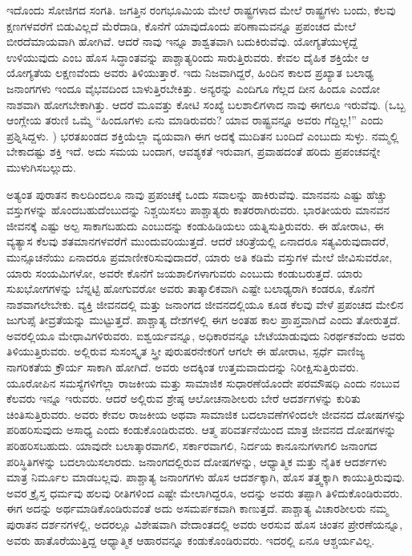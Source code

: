 ಇದೊಂದು ಸೋಜಿಗದ ಸಂಗತಿ. ಜಗತ್ತಿನ ರಂಗಭೂಮಿಯ ಮೇಲೆ ರಾಷ್ಟ್ರಗಳಾದ ಮೇಲೆ ರಾಷ್ಟ್ರಗಳು ಬಂದು, ಕೆಲವು ಕ್ಷಣಗಳವರೆಗೆ ಬಿಡುವಿಲ್ಲದೆ ಮೆರೆದಾಡಿ, ಕೊನೆಗೆ ಯಾವುದೊಂದು ಪರಿಣಾಮವನ್ನೂ ಪ್ರಪಂಚದ ಮೇಲೆ ಬೀರದೆಮಾಯವಾಗಿ ಹೋಗಿವೆ. ಆದರೆ ನಾವು ಇನ್ನೂ ಶಾಶ್ವತವಾಗಿ ಬದುಕಿರುವೆವು. ಯೋಗ್ಯತೆಯುಳ್ಳದ್ದೆ ಉಳಿಯುವುದು ಎಂಬ ಹೊಸ ಸಿದ್ಧಾಂತವನ್ನು ಪಾಶ್ಚಾತ್ಯರಿಂದು ಸಾರುತ್ತಿರುವರು. ಕೇವಲ ದೈಹಿಕ ಶಕ್ತಿಯೇ ಆ ಯೋಗ್ಯತೆಯ ಲಕ್ಷಣವೆಂದು ಅವರು ತಿಳಿಯುತ್ತಾರೆ. ಇದು ನಿಜವಾಗಿದ್ದರೆ, ಹಿಂದಿನ ಕಾಲದ ಪ್ರಖ್ಯಾತ ಬಲಾಢ್ಯ ಜನಾಂಗಗಳು ಇಂದೂ ವೈಭವದಿಂದ ಬಾಳುತ್ತಿರಬೇಕಿತ್ತು. ಅನ್ಯರನ್ನು ಎಂದಿಗೂ ಗೆಲ್ಲದ ದೀನ ಹಿಂದೂ ಎಂದೋ ನಾಶವಾಗಿ ಹೋಗಬೇಕಾಗಿತ್ತು. ಆದರೆ ಮೂವತ್ತು ಕೋಟಿ ಸಂಖ್ಯೆ ಬಲಶಾಲಿಗಳಾದ ನಾವು ಈಗಲೂ ಇರುವೆವು. (ಒಬ್ಬ ಆಂಗ್ಲೇಯ ತರುಣಿ ಒಮ್ಮೆ “ಹಿಂದೂಗಳು ಏನು ಮಾಡಿರುವರು? ಯಾವ ರಾಷ್ಟ್ರವನ್ನೂ ಅವರು ಗೆದ್ದಿಲ್ಲ!” ಎಂದು ಪ್ರಶ್ನಿಸಿದ್ದಳು. ) ಭರತಖಂಡದ ಶಕ್ತಿಯೆಲ್ಲಾ ವ್ಯಯವಾಗಿ ಈಗ ಅದಕ್ಕೆ ಮುದಿತನ ಬಂದಿದೆ ಎಂಬುದು ಸುಳ್ಳು. ನಮ್ಮಲ್ಲಿ ಬೇಕಾದಷ್ಟು ಶಕ್ತಿ ಇದೆ. ಅದು ಸಮಯ ಬಂದಾಗ, ಆವಶ್ಯಕತೆ ಇರುವಾಗ, ಪ್ರವಾಹದಂತೆ ಹರಿದು ಪ್ರಪಂಚವನ್ನೇ ಮುಳುಗಿಸಬಲ್ಲುದು. 

ಅತ್ಯಂತ ಪುರಾತನ ಕಾಲದಿಂದಲೂ ನಾವು ಪ್ರಪಂಚಕ್ಕೆ ಒಂದು ಸವಾಲನ್ನು ಹಾಕಿರುವೆವು. ಮಾನವನು ಎಷ್ಟು ಹೆಚ್ಚು ವಸ್ತುಗಳನ್ನು ಹೊಂದಬಹುದೆಂಬುದನ್ನು ನಿಶ್ಚಯಿಸಲು ಪಾಶ್ಚಾತ್ಯರು ಕಾತರರಾಗಿರುವರು. ಭಾರತೀಯರು ಮಾನವನ ಜೀವನಕ್ಕೆ ಎಷ್ಟು ಅಲ್ಪ ಸಾಕಾಗಬಹುದು ಎಂಬುದನ್ನು ಕಂಡುಹಿಡಿಯಲು ಯತ್ನಿಸುತ್ತಿರುವರು. ಈ ಹೋರಾಟ, ಈ ವ್ಯತ್ಯಾಸ ಕೆಲವು ಶತಮಾನಗಳವರೆಗೆ ಮುಂದುವರಿಯುತ್ತದೆ. ಆದರೆ ಚರಿತ್ರೆಯಲ್ಲಿ ಏನಾದರೂ ಸತ್ಯವಿರುವುದಾದರೆ, ಮುನ್ಸೂಚನೆಯು ಏನಾದರೂ ಪ್ರಮಾಣೀಕರಿಸುವುದಾದರೆ, ಯಾರು ಅತಿ ಕಡಿಮೆ ವಸ್ತುಗಳ ಮೇಲೆ ಜೀವಿಸುವರೋ, ಯಾರು ಸಂಯಮಿಗಳೋ, ಅವರೇ ಕೊನೆಗೆ ಜಯಶಾಲಿಗಳಾಗುವರು ಎಂಬುದು ಕಂಡುಬರುತ್ತದೆ. ಯಾರು ಸುಖಭೋಗಗಳನ್ನು ಬೆನ್ನಟ್ಟಿ ಹೋಗುವರೋ ಅವರು ತಾತ್ಕಾಲಿಕವಾಗಿ ಎಷ್ಟೇ ಬಲಾಢ್ಯರಾಗಿ ಕಂಡರೂ, ಕೊನೆಗೆ ನಾಶವಾಗಲೇಬೇಕು. ವ್ಯಕ್ತಿ ಜೀವನದಲ್ಲಿ ಮತ್ತು ಜನಾಂಗದ ಜೀವನದಲ್ಲಿಯೂ ಕೂಡ ಕೆಲವು ವೇಳೆ ಪ್ರಪಂಚದ ಮೇಲಿನ ಜುಗುಪ್ಸೆ ತೀವ್ರತೆಯನ್ನು ಮುಟ್ಟುತ್ತದೆ. ಪಾಶ್ಚಾತ್ಯ ದೇಶಗಳಲ್ಲಿ ಈಗ ಅಂತಹ ಕಾಲ ಪ್ರಾಪ್ತವಾಗಿದೆ ಎಂದು ತೋರುತ್ತದೆ. ಅವರಲ್ಲಿಯೂ ಮೇಧಾವಿಗಳಿರುವರು. ಐಶ್ವರ್ಯವನ್ನೂ, ಅಧಿಕಾರವನ್ನೂ ಬೇಟೆಯಾಡುವುದು ನಿರರ್ಥಕವೆಂದು ಅವರು ತಿಳಿಯುತ್ತಿರುವರು. ಅಲ್ಲಿರುವ ಸುಸಂಸ್ಕೃತ ಸ್ತ್ರೀ ಪುರುಷರನೇಕರಿಗೆ ಆಗಲೇ ಈ ಹೋರಾಟ, ಸ್ಪರ್ಧೆ ವಾಣಿಜ್ಯ ನಾಗರಿಕತೆಯ ಕ್ರೌರ್ಯ ಸಾಕಾಗಿ ಹೋಗಿದೆ. ಅವರು ಅದಕ್ಕಿಂತ ಉತ್ತಮವಾದುದನ್ನು ನಿರೀಕ್ಷಿಸುತ್ತಿರುವರು. ಯೂರೋಪಿನ ಸಮಸ್ಯೆಗಳಿಗೆಲ್ಲಾ ರಾಜಕೀಯ ಮತ್ತು ಸಾಮಾಜಿಕ ಸುಧಾರಣೆಯೊಂದೇ ಪರಮೌಷಧಿ ಎಂದು ನಂಬುವ ಕೆಲವರು ಇನ್ನೂ ಇರುವರು. ಆದರೆ ಅಲ್ಲಿರುವ ಶ್ರೇಷ್ಠ ಆಲೋಚನಾಶೀಲರು ಬೇರೆ ಆದರ್ಶಗಳನ್ನು ಕುರಿತು ಚಿಂತಿಸುತ್ತಿರುವರು. ಅವರು ಕೇವಲ ರಾಜಕೀಯ ಅಥವಾ ಸಾಮಾಜಿಕ ಬದಲಾವಣೆಗಳಿಂದಲೇ ಜೀವನದ ದೋಷಗಳನ್ನು ಪರಿಹರಿಸುವುದು ಅಸಾಧ್ಯ ಎಂದು ಕಂಡುಕೊಂಡಿರುವರು. ಆತ್ಮ ಪರಿವರ್ತನೆಯಿಂದ ಮಾತ್ರ ಜೀವನದ ದೋಷಗಳನ್ನು ಪರಿಹರಿಸಬಹುದು. ಯಾವುದೇ ಬಲಾತ್ಕಾರವಾಗಲಿ, ಸರ್ಕಾರವಾಗಲಿ, ನಿರ್ದಯ ಕಾನೂನುಗಳಾಗಲಿ ಜನಾಂಗದ ಪರಿಸ್ಥಿತಿಗಳನ್ನು ಬದಲಾಯಿಸಲಾರದು. ಜನಾಂಗದಲ್ಲಿರುವ ದೋಷಗಳನ್ನು, ಆಧ್ಯಾತ್ಮಿಕ ಮತ್ತು ನೈತಿಕ ಆದರ್ಶಗಳು ಮಾತ್ರ ನಿರ್ಮೂಲ ಮಾಡಬಲ್ಲವು. ಪಾಶ್ಚಾತ್ಯ ಜನಾಂಗಗಳು ಹೊಸ ಆದರ್ಶಕ್ಕಾಗಿ, ಹೊಸ ತತ್ತ್ವಕ್ಕಾಗಿ ಕಾಯುತ್ತಿರುವುವು. ಅವರ ಕ್ರೈಸ್ತ ಧರ್ಮವು ಹಲವು ರೀತಿಗಳಿಂದ ಎಷ್ಟೇ ಮೇಲಾಗಿದ್ದರೂ, ಅದನ್ನು ಅವರು ತಪ್ಪಾಗಿ ತಿಳಿದುಕೊಂಡಿರುವರು. ಈಗ ಅದನ್ನು ಅರ್ಥಮಾಡಿಕೊಂಡಿರುವಂತೆ ಅದು ಅಸಮರ್ಪಕವಾಗಿ ಕಾಣುತ್ತದೆ. ಪಾಶ್ಚಾತ್ಯ ವಿಚಾರಶೀಲರು ನಮ್ಮ ಪುರಾತನ ದರ್ಶನಗಳಲ್ಲಿ, ಅದರಲ್ಲೂ ವಿಶೇಷವಾಗಿ ವೇದಾಂತದಲ್ಲಿ ಅವರು ಅರಸುವ ಹೊಸ ಚಿಂತನ ಪ್ರೇರಣೆಯನ್ನೂ, ಅವರು ಹಾತೊರೆಯುತ್ತಿದ್ದ ಆಧ್ಯಾತ್ಮಿಕ ಆಹಾರವನ್ನೂ ಕಂಡುಕೊಂಡಿರುವರು. ಇದರಲ್ಲಿ ಏನೂ ಆಶ್ಚರ್ಯವಿಲ್ಲ. 

